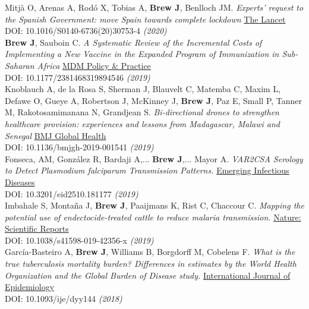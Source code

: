 \documentclass[11pt]{article}
\begin{document}
\noindent Mitjà O, Arenas A, Rodó X, Tobias A, \textbf{Brew J}, Benlloch JM. \emph{Experts' request to the Spanish Government: move Spain towards complete lockdown} \href{https://www.thelancet.com/pb-assets/Lancet/pdfs/S0140673620307534.pdf}{The Lancet} \\ DOI: 10.1016/S0140-6736(20)30753-4 \hfill \emph{(2020)} \\

\noindent \textbf{Brew J}, Sauboin C. \emph{A Systematic Review of the Incremental Costs of Implementing a New Vaccine in the Expanded Program of Immunization in Sub-Saharan Africa} \href{https://doi.org/10.1177/2381468319894546}{MDM Policy & Practice} \\ DOI: 10.1177/2381468319894546 \hfill \emph{(2019)} \\

\noindent Knoblauch A, de la Rosa S, Sherman J, Blauvelt C, Matemba C, Maxim L, Defawe O, Gueye A, Robertson J, McKinney J, \textbf{Brew J}, Paz E, Small P, Tanner M, Rakotosamimanana N, Grandjean S. \emph{Bi-directional drones to strengthen healthcare provision: experiences and lessons from Madagascar, Malawi and Senegal} \href{https://dx.doi.org/10.1136/bmjgh-2019-001541}{BMJ Global Health} \\ DOI: 10.1136/bmjgh-2019-001541 \hfill \emph{(2019)} \\


\noindent Fonseca, AM, González R, Bardaji A,... \textbf{Brew J},... Mayor A. \emph{VAR2CSA Serology to Detect Plasmodium falciparum Transmission Patterns.} \href{https://wwwnc.cdc.gov/eid/article/25/10/18-1177_article}{Emerging Infectious Diseases} \\ DOI: 10.3201/eid2510.181177 \hfill \emph{(2019)} \\  


\noindent Imbahale S, Montaña J, \textbf{Brew J}, Paaijmans K, Rist C, Chaccour C. \emph{Mapping the potential use of endectocide-treated cattle to reduce malaria transmission.} \href{www.nature.com/articles/s41598-019-42356-x}{Nature: Scientific Reports} \\ DOI: 10.1038/s41598-019-42356-x \hfill \emph{(2019)} \\


\noindent García-Basteiro A, \textbf{Brew J}, Williams B, Borgdorff M, Cobelens F. \emph{What is the true tuberculosis mortality burden? Differences in estimates by the World Health Organization and the Global Burden of Disease study.} \href{https://academic.oup.com/ije/advance-article-abstract/doi/10.1093/ije/dyy144/5053290}{International Journal of Epidemiology} \\ DOI: 10.1093/ije/dyy144 \hfill \emph{(2018)} \\
\end{document}
